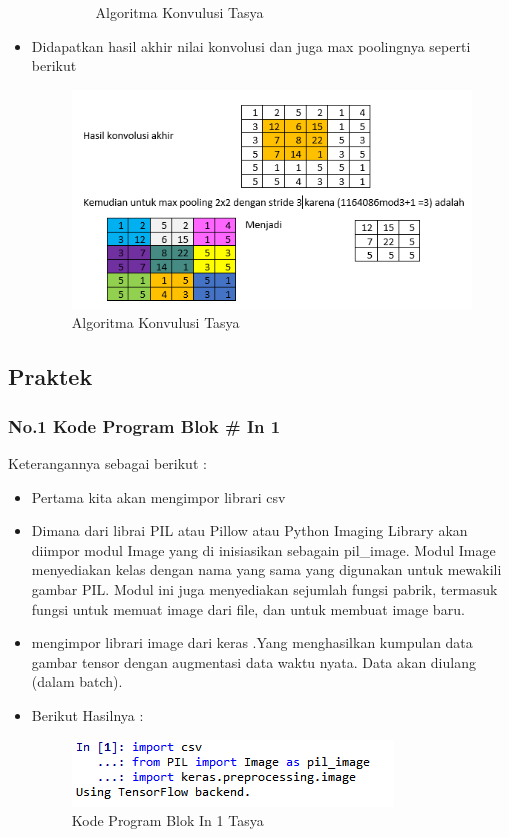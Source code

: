 \begin{itemize}
\begin{itemize}
\begin{figure}[ht]
\caption{Algoritma Konvulusi Tasya}
\label{Teori}
\end{figure}
\end{itemize}
\item Didapatkan hasil akhir nilai konvolusi dan juga max poolingnya seperti berikut
\begin{figure}[ht]
\centering
\includegraphics[scale=0.5]{figures/Chapter 7/1164086/Teori/chapter7tasya13.png}
\caption{Algoritma Konvulusi Tasya}
\label{Teori}
\end{figure}
\end{itemize}


\subsection{Praktek}
\subsubsection{No.1 Kode Program Blok \# In 1}

Keterangannya sebagai berikut :\\
\begin{itemize}
\item Pertama kita akan mengimpor librari csv
\item Dimana dari librai PIL atau Pillow atau Python Imaging Library akan diimpor modul Image yang di inisiasikan sebagain pil\_image. Modul Image menyediakan kelas dengan nama yang sama yang digunakan untuk mewakili gambar PIL. Modul ini juga menyediakan sejumlah fungsi pabrik, termasuk fungsi untuk memuat image dari file, dan untuk membuat image baru.
\item mengimpor librari image dari keras .Yang menghasilkan kumpulan data gambar tensor dengan augmentasi data waktu nyata. Data akan diulang (dalam batch). 
\item Berikut Hasilnya :\\
\begin{figure}[ht]
\centering
\includegraphics[scale=0.5]{figures/Chapter 7/1164086/Praktek/chapter7tasya14.png}
\caption{Kode Program Blok In 1 Tasya}
\label{Praktek}
\end{figure}
\end{itemize}

